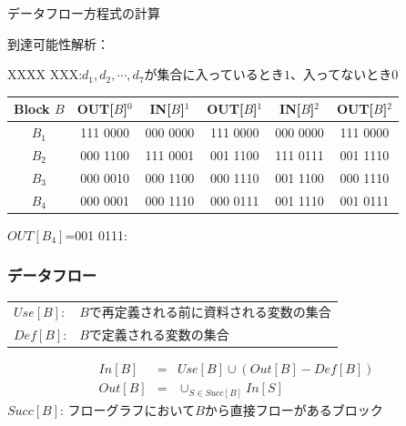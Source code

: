 \documentclass[dvipdfmx]{beamer}
\begin{document}
\begin{frame}{データフロー方程式の計算}

到達可能性解析：

{\small
{XXXX XXX}:$d_1,d_2,\cdots,d_7$が集合に入っているとき$1$、入ってないとき$0$
}

\vspace*{10pt}

{\footnotesize
\begin{tabular}{c|c|c|c|c|c}\hline
Block $B$ & OUT[$B$]$^0$ & IN[$B$]$^1$ & OUT[$B$]$^1$ & IN[$B$]$^2$ & OUT[$B$]$^2$\\\hline
$B_1$ & 111 0000 & 000 0000 & 111 0000 & 000 0000 & 111 0000\\
$B_2$ & 000 1100 & 111 0001 & 001 1100 & 111 0111 & 001 1110\\
$B_3$ & 000 0010 & 000 1100 & 000 1110 & 001 1100 & 000 1110\\
$B_4$ & 000 0001 & 000 1110 & 000 0111 & 001 1110 & 001 0111\\\hline
\end{tabular}
}

\vspace*{10pt}



$OUT[B_4]$=001 0111:\\

\end{frame}

\begin{frame}
  \frametitle{データフロー}
  \begin{tabular}{ll}
  $Use[B]$: & $B$で再定義される前に資料される変数の集合\\
  $Def[B]$: & $B$で定義される変数の集合
  \end{tabular}

  \begin{eqnarray*}
    In[B] & = & Use[B]\cup(Out[B]-Def[B])\\
    Out[B] & = & \cup_{S\in Succ[B]}In[S]
  \end{eqnarray*}
  $Succ[B]$: フローグラフにおいて$B$から直接フローがあるブロック
\end{frame}
\end{document}
